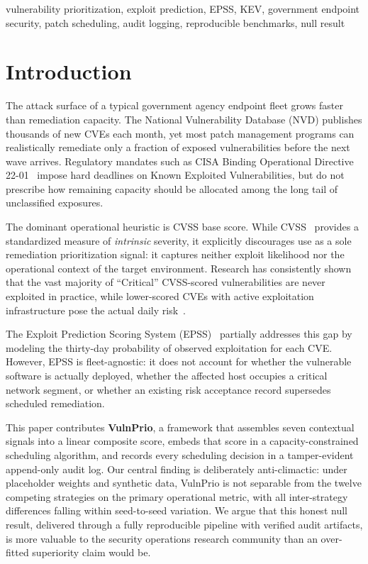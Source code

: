 \documentclass[journal]{IEEEtran}
\begin{document}
\begin{IEEEkeywords}
vulnerability prioritization, exploit prediction, EPSS, KEV,
government endpoint security, patch scheduling, audit logging,
reproducible benchmarks, null result
\end{IEEEkeywords}

\section{Introduction}
\label{sec:intro}

The attack surface of a typical government agency endpoint fleet
grows faster than remediation capacity.  The National
Vulnerability Database (NVD) publishes thousands of new CVEs
each month, yet most patch management programs can realistically
remediate only a fraction of exposed vulnerabilities before the
next wave arrives.  Regulatory mandates such as CISA Binding
Operational Directive 22-01~\cite{cisa_bod2201} impose hard
deadlines on Known Exploited Vulnerabilities, but do not
prescribe how remaining capacity should be allocated among the
long tail of unclassified exposures.

The dominant operational heuristic is CVSS base score.  While
CVSS~\cite{first_cvss_v31} provides a standardized measure of
\emph{intrinsic} severity, it explicitly discourages use as a
sole remediation prioritization signal: it captures neither
exploit likelihood nor the operational context of the target
environment.  Research has consistently shown that the vast
majority of ``Critical'' CVSS-scored vulnerabilities are never
exploited in practice, while lower-scored CVEs with active
exploitation infrastructure pose the actual daily
risk~\cite{allodi2014comparing, sabottke2015vulnerability}.

The Exploit Prediction Scoring System
(EPSS)~\cite{jacobs2021epss} partially addresses this gap by
modeling the thirty-day probability of observed exploitation for
each CVE.  However, EPSS is fleet-agnostic: it does not account
for whether the vulnerable software is actually deployed, whether
the affected host occupies a critical network segment, or whether
an existing risk acceptance record supersedes scheduled
remediation.

This paper contributes \textbf{VulnPrio}, a framework that
assembles seven contextual signals into a linear composite score,
embeds that score in a capacity-constrained scheduling algorithm,
and records every scheduling decision in a tamper-evident
append-only audit log.  Our central finding is deliberately
anti-climactic: under placeholder weights and synthetic data,
VulnPrio is not separable from the twelve
competing strategies on the primary operational metric, with all
inter-strategy differences falling within seed-to-seed variation.  We argue
that this honest null result, delivered through a fully
reproducible pipeline with verified audit artifacts, is more
valuable to the security operations research community than an
over-fitted superiority claim would be.
\end{document}
